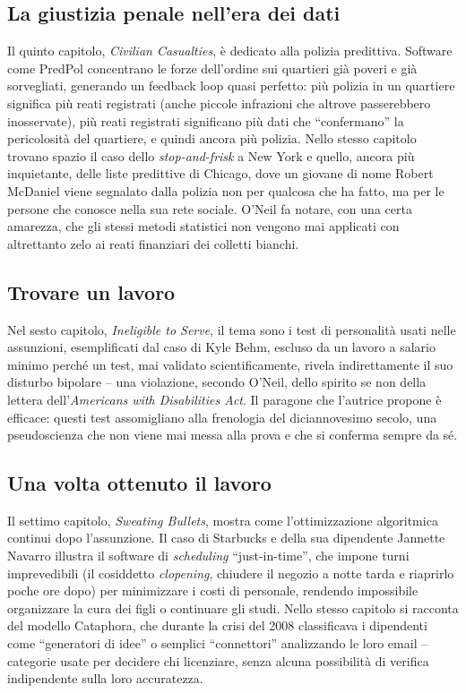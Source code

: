 \documentclass[a4paper,11pt]{article}
\begin{document}
\subsection{La giustizia penale nell'era dei dati}

Il quinto capitolo, \emph{Civilian Casualties}, è dedicato alla polizia predittiva. Software come PredPol concentrano le forze dell'ordine sui quartieri già poveri e già sorvegliati, generando un feedback loop quasi perfetto: più polizia in un quartiere significa più reati registrati (anche piccole infrazioni che altrove passerebbero inosservate), più reati registrati significano più dati che ``confermano'' la pericolosità del quartiere, e quindi ancora più polizia. Nello stesso capitolo trovano spazio il caso dello \emph{stop-and-frisk} a New York e quello, ancora più inquietante, delle liste predittive di Chicago, dove un giovane di nome Robert McDaniel viene segnalato dalla polizia non per qualcosa che ha fatto, ma per le persone che conosce nella sua rete sociale. O'Neil fa notare, con una certa amarezza, che gli stessi metodi statistici non vengono mai applicati con altrettanto zelo ai reati finanziari dei colletti bianchi.

\subsection{Trovare un lavoro}

Nel sesto capitolo, \emph{Ineligible to Serve}, il tema sono i test di personalità usati nelle assunzioni, esemplificati dal caso di Kyle Behm, escluso da un lavoro a salario minimo perché un test, mai validato scientificamente, rivela indirettamente il suo disturbo bipolare -- una violazione, secondo O'Neil, dello spirito se non della lettera dell'\emph{Americans with Disabilities Act}. Il paragone che l'autrice propone è efficace: questi test assomigliano alla frenologia del diciannovesimo secolo, una pseudoscienza che non viene mai messa alla prova e che si conferma sempre da sé.

\subsection{Una volta ottenuto il lavoro}

Il settimo capitolo, \emph{Sweating Bullets}, mostra come l'ottimizzazione algoritmica continui dopo l'assunzione. Il caso di Starbucks e della sua dipendente Jannette Navarro illustra il software di \emph{scheduling} ``just-in-time'', che impone turni imprevedibili (il cosiddetto \emph{clopening}, chiudere il negozio a notte tarda e riaprirlo poche ore dopo) per minimizzare i costi di personale, rendendo impossibile organizzare la cura dei figli o continuare gli studi. Nello stesso capitolo si racconta del modello Cataphora, che durante la crisi del 2008 classificava i dipendenti come ``generatori di idee'' o semplici ``connettori'' analizzando le loro email -- categorie usate per decidere chi licenziare, senza alcuna possibilità di verifica indipendente sulla loro accuratezza.
\end{document}
